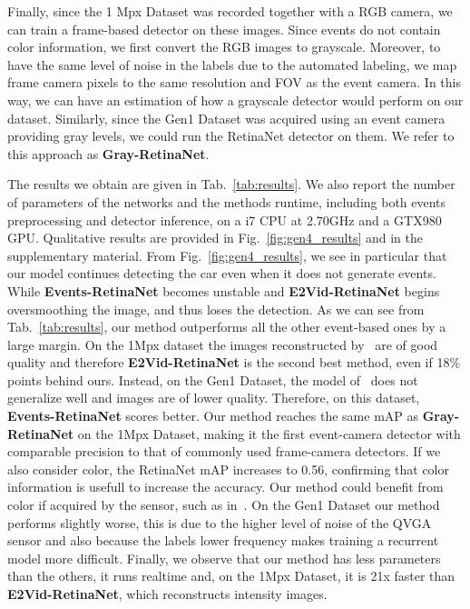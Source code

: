 \documentclass{article}
\begin{document}
Finally, since the 1 Mpx Dataset was recorded together with a RGB camera, we can train a frame-based detector on these images. Since events do not contain color information, we first convert the RGB images to grayscale. Moreover, to have the same level of noise in the labels due to the automated labeling, we map frame camera pixels to the same resolution and FOV as the event camera.
In this way, we can have an estimation 
of how a grayscale detector would perform on our dataset.
Similarly, since the Gen1 Dataset was acquired using an event camera providing gray levels, we could run the RetinaNet detector on them.
We refer to this approach as \textbf{Gray-RetinaNet}.


The results we obtain are given in Tab.~\ref{tab:results}. We also report the number of parameters of the networks and the methods runtime, including both events preprocessing and detector inference, on a i7 CPU at 2.70GHz and a GTX980 GPU.  
Qualitative results are provided in Fig.~\ref{fig:gen4_results} and in the supplementary material.
From Fig.~\ref{fig:gen4_results}, we see in particular that our model continues detecting the car even when it does not generate events.
While \textbf{Events-RetinaNet} becomes unstable and \textbf{E2Vid-RetinaNet} begins oversmoothing the image, and thus loses the detection. 
As we can see from Tab.~\ref{tab:results}, our method outperforms all the other event-based ones by a large margin. On the 1Mpx dataset the images reconstructed by~\cite{rebecq2019high}  are of good quality and therefore \textbf{E2Vid-RetinaNet} is the second best method, even if 18\% points behind ours. Instead, on the Gen1 Dataset, the model of~\cite{rebecq2019high} does not generalize well and images are of lower quality. Therefore, on this dataset, \textbf{Events-RetinaNet} scores better. 
Our method reaches the same mAP as \textbf{Gray-RetinaNet} on the 1Mpx Dataset, making it the first event-camera detector with comparable precision to that of commonly used frame-camera detectors. 
If we also consider color, the RetinaNet mAP increases to 0.56, confirming that color information is usefull to increase the accuracy. Our method could benefit from color if acquired by the sensor, such as in~\cite{li2015design}.
On the Gen1 Dataset our method performs slightly worse, this is due to the higher level of noise of the QVGA sensor and also because the labels lower frequency makes training a recurrent model more difficult.
Finally, we observe that our method has less parameters than the others, it runs realtime and, on the 1Mpx Dataset, it is 21x faster than \textbf{E2Vid-RetinaNet}, which reconstructs intensity images.
\end{document}

